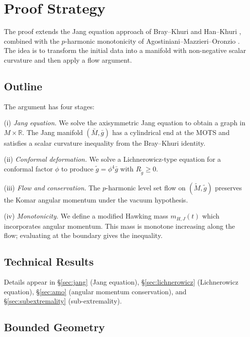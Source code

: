 \documentclass[12pt]{article}
\theoremstyle{plain}
\theoremstyle{definition}
\theoremstyle{remark}
\begin{document}
\section{Proof Strategy}\label{sec:proof-outline}

The proof extends the Jang equation approach of Bray--Khuri \cite{braykhuri2010} and Han--Khuri \cite{hankhuri2013}, combined with the $p$-harmonic monotonicity of Agostiniani--Mazzieri--Oronzio \cite{amo2022}. The idea is to transform the initial data into a manifold with non-negative scalar curvature and then apply a flow argument.

\subsection{Outline}

The argument has four stages:

(i) \emph{Jang equation.} We solve the axisymmetric Jang equation to obtain a graph in $M \times \mathbb{R}$. The Jang manifold $(\bar{M}, \bar{g})$ has a cylindrical end at the MOTS and satisfies a scalar curvature inequality from the Bray--Khuri identity.

(ii) \emph{Conformal deformation.} We solve a Lichnerowicz-type equation for a conformal factor $\phi$ to produce $\tilde{g} = \phi^4 \bar{g}$ with $R_{\tilde{g}} \geq 0$.

(iii) \emph{Flow and conservation.} The $p$-harmonic level set flow on $(\tilde{M}, \tilde{g})$ preserves the Komar angular momentum under the vacuum hypothesis.

(iv) \emph{Monotonicity.} We define a modified Hawking mass $m_{H,J}(t)$ which incorporates angular momentum. This mass is monotone increasing along the flow; evaluating at the boundary gives the inequality.

\subsection{Technical Results}

Details appear in \S\ref{sec:jang} (Jang equation), \S\ref{sec:lichnerowicz} (Lichnerowicz equation), \S\ref{sec:amo} (angular momentum conservation), and \S\ref{sec:subextremality} (sub-extremality).

\subsection{Bounded Geometry}\label{subsec:bounded-geometry}
\end{document}
